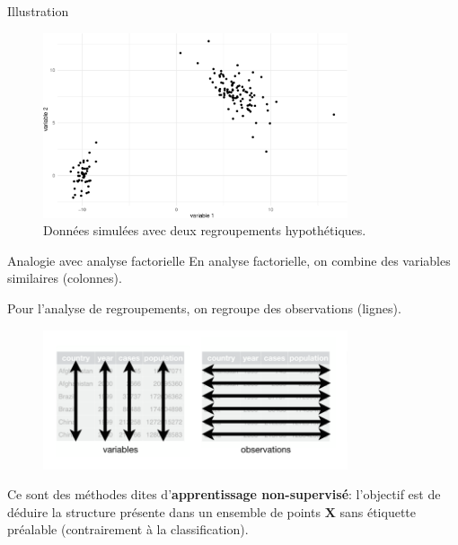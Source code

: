 \documentclass[
  ignorenonframetext,
]{beamer}
\begin{document}
\begin{frame}{Illustration}
\protect\hypertarget{illustration}{}
\begin{figure}

{\centering \includegraphics[width=0.8\textwidth,height=\textheight]{MATH60602-diapos11_files/figure-beamer/fig-regroupements-bidons-1.pdf}

}

\caption{\label{fig-regroupements-bidons}Données simulées avec deux
regroupements hypothétiques.}

\end{figure}
\end{frame}

\begin{frame}{Analogie avec analyse factorielle}
\protect\hypertarget{analogie-avec-analyse-factorielle}{}
En analyse factorielle, on combine des variables similaires (colonnes).

Pour l'analyse de regroupements, on regroupe des observations (lignes).

\begin{figure}

{\centering \includegraphics[width=0.8\textwidth,height=\textheight]{figures/tidy-data-sub.png}

}

\end{figure}

Ce sont des méthodes dites d'\textbf{apprentissage non-supervisé}:
l'objectif est de déduire la structure présente dans un ensemble de
points \(\mathbf{X}\) sans étiquette préalable (contrairement à la
classification).
\end{frame}
\end{document}
